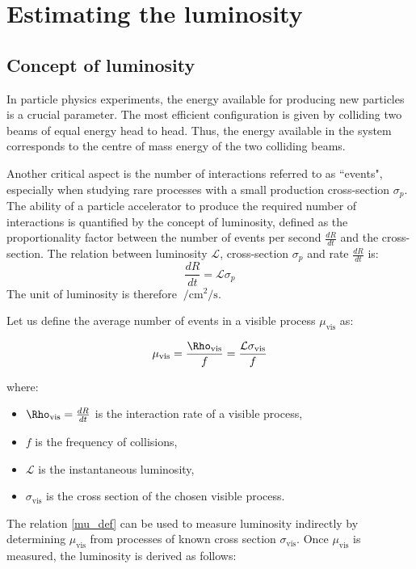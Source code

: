 \chapter{Estimating the luminosity}\label{chap:luminosity}

\section{Concept of luminosity}
In particle physics experiments, the energy available for producing new particles is a crucial parameter. The most efficient configuration is given by colliding two beams of equal energy head to head. Thus, the energy available in the system corresponds to the centre of mass energy of the two colliding beams.

Another critical aspect is the number of interactions referred to as ``events", especially when studying rare processes with a small production cross-section $\sigma_p$. The ability of a particle accelerator to produce the required number of interactions is quantified by the concept of luminosity, defined as the proportionality factor between the number of events per second $\tfrac{dR}{dt}$ and the cross-section. The relation between luminosity $\mathcal{L}$, cross-section $\sigma_p$ and rate $\tfrac{dR}{dt}$ is:
\begin{equation}
    \frac{dR}{dt} = \mathcal{L}{\sigma_p}\label{lumi_def}
\end{equation}
The unit of luminosity is therefore $\SI{}{\per\centi\meter\squared\per\second}$.
 
Let us define the average number of events in a visible process $\mu_{\text{vis}}$ as:

\begin{equation}
\mu_{\text{vis}} = \frac{\Rho_{\text{vis}}}{f} = \frac{\mathcal{L} \sigma_{\text{vis}}}{f}\label{mu_def}
\end{equation}

where:
\begin{itemize}
\item  $\Rho_{\text{vis}}=\tfrac{dR}{dt}$ is the interaction rate of a visible process,
\item  $f$ is the frequency of collisions,
\item  $\mathcal{L}$ is the instantaneous luminosity,
\item  $\sigma_{\text{vis}}$ is the cross section of the chosen visible process.
\end{itemize}
The relation \eqref{mu_def} can be used to measure luminosity indirectly by determining $\mu_{\text{vis}}$ from processes of known cross section $\sigma_\text{vis}$.
Once $\mu_{\text{vis}}$ is measured, the luminosity is derived as follows:

